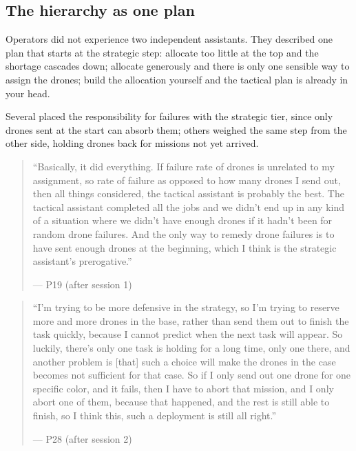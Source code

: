 
\subsection{The hierarchy as one plan}\label{sec:qual:hierarchy}

Operators did not experience two independent assistants. They described one plan that starts at the strategic step: allocate too little at the top and the shortage cascades down; allocate generously and there is only one sensible way to assign the drones; build the allocation yourself and the tactical plan is already in your head.


\label{sec:qual:hierarchy:cascade}
Several placed the responsibility for failures with the strategic tier, since only drones sent at the start can absorb them; others weighed the same step from the other side, holding drones back for missions not yet arrived.

\begin{quote}\small
``Basically, it did everything. If failure rate of drones is unrelated to my assignment, so rate of failure as opposed to how many drones I send out, then all things considered, the tactical assistant is probably the best. The tactical assistant completed all the jobs and we didn't end up in any kind of a situation where we didn't have enough drones if it hadn't been for random drone failures. And the only way to remedy drone failures is to have sent enough drones at the beginning, which I think is the strategic assistant's prerogative.''\par\hfill--- P19 (after session 1)
\end{quote}

\begin{quote}\small
``I'm trying to be more defensive in the strategy, so I'm trying to reserve more and more drones in the base, rather than send them out to finish the task quickly, because I cannot predict when the next task will appear. So luckily, there's only one task is holding for a long time, only one there, and another problem is [that] such a choice will make the drones in the case becomes not sufficient for that case. So if I only send out one drone for one specific color, and it fails, then I have to abort that mission, and I only abort one of them, because that happened, and the rest is still able to finish, so I think this, such a deployment is still all right.''\par\hfill--- P28 (after session 2)
\end{quote}


